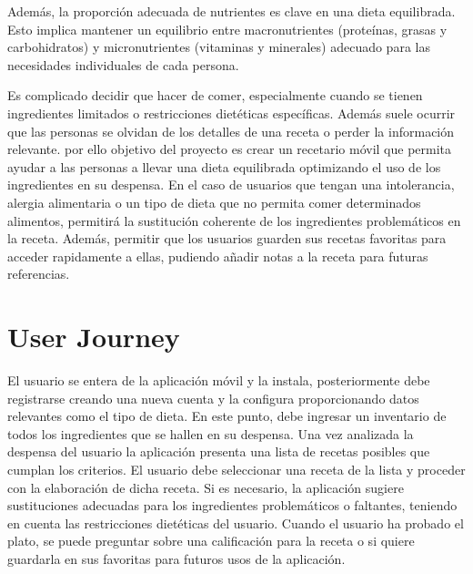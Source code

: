 Además, la proporción adecuada de nutrientes es clave en una dieta equilibrada. Esto implica mantener un equilibrio entre macronutrientes (proteínas, grasas y carbohidratos) y micronutrientes (vitaminas y minerales) adecuado para las necesidades individuales de cada persona.

Es complicado decidir que hacer de comer, especialmente cuando se tienen ingredientes limitados o restricciones dietéticas específicas. Además suele ocurrir que las personas se olvidan de los detalles de una receta o perder la información relevante. por ello objetivo del proyecto es crear un recetario móvil que permita ayudar a las personas a llevar una dieta equilibrada optimizando el uso de los ingredientes en su despensa. En el caso de usuarios que tengan una intolerancia, alergia alimentaria o un tipo de dieta que no permita comer determinados alimentos, permitirá la sustitución coherente de los ingredientes problemáticos en la receta. Además, permitir que los usuarios guarden sus recetas favoritas para acceder rapidamente a ellas, pudiendo añadir notas a la receta para futuras referencias.

\section{User Journey}
El usuario se entera de la aplicación móvil y la instala, posteriormente debe registrarse creando una nueva cuenta y la configura proporcionando datos relevantes como el tipo de dieta. En este punto, debe ingresar un inventario de todos los ingredientes que se hallen en su despensa. Una vez analizada la despensa del usuario la aplicación presenta una lista de recetas posibles que cumplan los criterios. El usuario debe seleccionar una receta de la lista y proceder con la elaboración de dicha receta. Si es necesario, la aplicación sugiere sustituciones adecuadas para los ingredientes problemáticos o faltantes, teniendo en cuenta las restricciones dietéticas del usuario. Cuando el usuario ha probado el plato, se puede preguntar sobre una calificación para la receta o si quiere guardarla en sus favoritas para futuros usos de la aplicación. 

